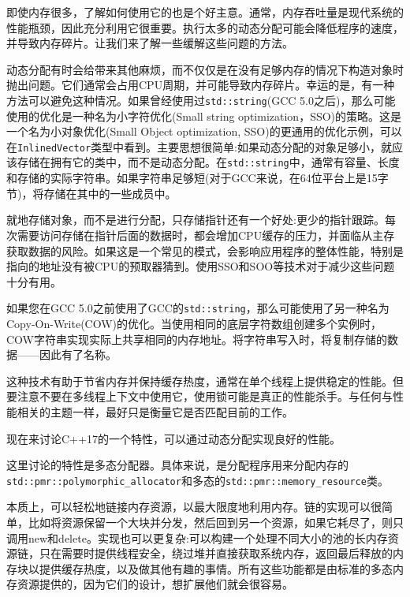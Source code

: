 

即使内存很多，了解如何使用它的也是个好主意。通常，内存吞吐量是现代系统的性能瓶颈，因此充分利用它很重要。执行太多的动态分配可能会降低程序的速度，并导致内存碎片。让我们来了解一些缓解这些问题的方法。


动态分配有时会给带来其他麻烦，而不仅仅是在没有足够内存的情况下构造对象时抛出问题。它们通常会占用CPU周期，并可能导致内存碎片。幸运的是，有一种方法可以避免这种情况。如果曾经使用过\texttt{std::string}(GCC 5.0之后)，那么可能使用的优化是一种名为小字符优化(Small string optimization，SSO)的策略。这是一个名为小对象优化(Small Object optimization, SSO)的更通用的优化示例，可以在\texttt{InlinedVector}类型中看到。主要思想很简单:如果动态分配的对象足够小，就应该存储在拥有它的类中，而不是动态分配。在\texttt{std::string}中，通常有容量、长度和存储的实际字符串。如果字符串足够短(对于GCC来说，在64位平台上是15字节)，将存储在其中的一些成员中。

就地存储对象，而不是进行分配，只存储指针还有一个好处:更少的指针跟踪。每次需要访问存储在指针后面的数据时，都会增加CPU缓存的压力，并面临从主存获取数据的风险。如果这是一个常见的模式，会影响应用程序的整体性能，特别是指向的地址没有被CPU的预取器猜到。使用SSO和SOO等技术对于减少这些问题十分有用。


如果您在GCC 5.0之前使用了GCC的\texttt{std::string}，那么可能使用了另一种名为Copy-On-Write(COW)的优化。当使用相同的底层字符数组创建多个实例时，COW字符串实现实际上共享相同的内存地址。将字符串写入时，将复制存储的数据——因此有了名称。

这种技术有助于节省内存并保持缓存热度，通常在单个线程上提供稳定的性能。但要注意不要在多线程上下文中使用它，使用锁可能是真正的性能杀手。与任何与性能相关的主题一样，最好只是衡量它是否匹配目前的工作。

现在来讨论C++17的一个特性，可以通过动态分配实现良好的性能。


这里讨论的特性是多态分配器。具体来说，是分配程序用来分配内存的\texttt{std::pmr::polymorphic\_allocator}和多态的\texttt{std::pmr::memory\_resource}类。

本质上，可以轻松地链接内存资源，以最大限度地利用内存。链的实现可以很简单，比如将资源保留一个大块并分发，然后回到另一个资源，如果它耗尽了，则只调用new和delete。实现也可以更复杂:可以构建一个处理不同大小的池的长内存资源链，只在需要时提供线程安全，绕过堆并直接获取系统内存，返回最后释放的内存块以提供缓存热度，以及做其他有趣的事情。所有这些功能都是由标准的多态内存资源提供的，因为它们的设计，想扩展他们就会很容易。

